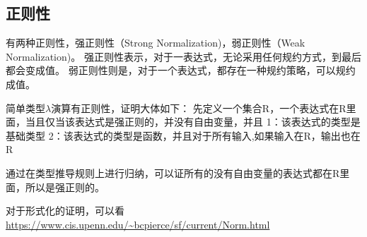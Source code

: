 \subsection{正则性}

有两种正则性，强正则性（Strong Normalization)，弱正则性（Weak  Normalization)。
强正则性表示，对于一表达式，无论采用任何规约方式，到最后都会变成值。
弱正则性则是，对于一个表达式，都存在一种规约策略，可以规约成值。

简单类型$\lambda$演算有正则性，证明大体如下：
先定义一个集合R，一个表达式在R里面，当且仅当该表达式是强正则的，并没有自由变量，并且
1：该表达式的类型是基础类型
2：该表达式的类型是函数，并且对于所有输入,如果输入在R，输出也在R

通过在类型推导规则上进行归纳，可以证所有的没有自由变量的表达式都在R里面，所以是强正则的。

对于形式化的证明，可以看 \url {https://www.cis.upenn.edu/~bcpierce/sf/current/Norm.html}
